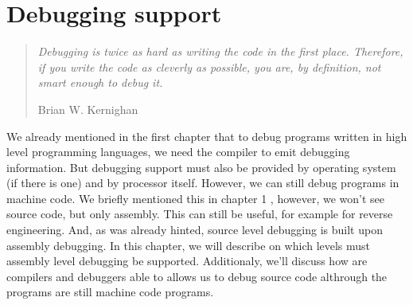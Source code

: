 \chapter{Debugging support}

\begin{quote}
  \textit{Debugging is twice as hard as writing the code in the first place.
    Therefore, if you write the code as cleverly as possible, you are, by
    definition, not smart enough to debug it.}\begin{flushright}
    \tiny{Brian W. Kernighan}
  \end{flushright}
\end{quote}

We already mentioned in the first chapter that to debug programs written in
high level programming languages, we need the compiler to emit debugging
information. But debugging support must also be provided by operating system
(if there is one) and by processor itself. However, we can still debug programs
in machine code. We briefly mentioned this in chapter 1 , however, we
won't see source code, but only assembly. This can still be useful, for example
for reverse engineering. And, as was already hinted, source level debugging is
built upon assembly debugging. In this chapter, we will describe on which
levels must assembly level debugging be supported. Additionaly, we'll discuss
how are compilers and debuggers able to allows us to debug source code
althrough the programs are still machine code programs. 

